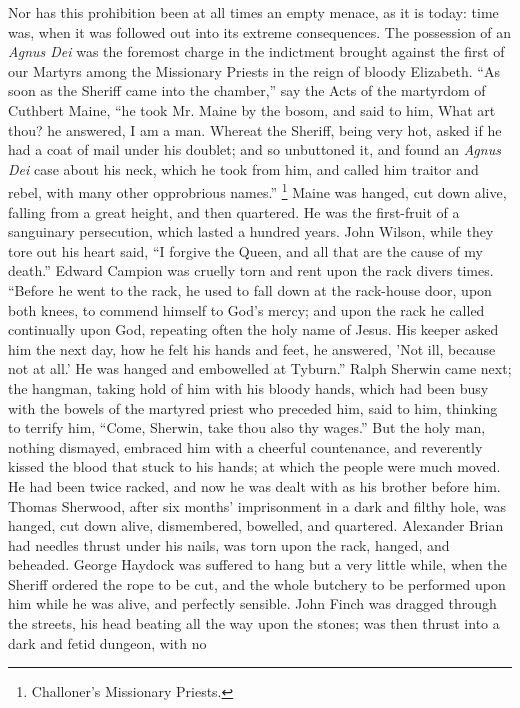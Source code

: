 Nor has this prohibition been at all times an empty
menace, as it is today: time was, when it was followed
out into its extreme consequences. The possession of an \emph{Agnus
Dei} was the foremost charge in the indictment
brought against the first of our Martyrs among the
Missionary Priests in the reign of bloody Elizabeth.
``As soon as the Sheriff came into the chamber,''
say the Acts of the martyrdom of Cuthbert Maine, ``he
took Mr. Maine by the bosom, and said to him, What art
thou? he answered, I am a man. Whereat the Sheriff, being
very hot, asked if he had a coat of mail under his
doublet; and so unbuttoned it, and found an \emph{Agnus Dei}
case about his neck, which he took from him, and called
him traitor and rebel, with many other opprobrious
names.'' \footnote{Challoner's Missionary
Priests.} Maine was hanged, cut down alive, falling from a
great height, and then quartered. He was the first-fruit
of a sanguinary persecution, which lasted a hundred
years. John Wilson, while they tore out his heart said,
``I forgive the Queen, and all that are the cause of
my death.'' Edward Campion was cruelly torn and rent
upon the rack divers times. ``Before he went to the
rack, he used to fall down at the rack-house door, upon
both knees, to commend himself to God's mercy; and upon
the rack he called continually upon God, repeating often
the holy name of Jesus. His keeper asked him the next
day, how he felt his hands and feet, he answered, 'Not
ill, because not at all.' He was hanged and embowelled at
Tyburn.'' Ralph Sherwin came next; the hangman,
taking hold of him with his bloody hands, which had been
busy with the bowels of the martyred priest who preceded
him, said to him, thinking to terrify him, ``Come,
Sherwin, take thou also thy wages.'' But the holy
man, nothing dismayed, embraced him with a cheerful
countenance, and reverently kissed the blood that stuck
to his hands; at which the people were much moved. He had
been twice racked, and now he was dealt with as his
brother before him. Thomas Sherwood, after six months'
imprisonment in a dark and filthy hole, was hanged, cut
down alive, dismembered, bowelled, and quartered.
Alexander Brian had needles thrust under his nails, was
torn upon the rack, hanged, and beheaded. George Haydock
was suffered to hang but a very little while, when the
Sheriff ordered the rope to be cut, and the whole
butchery to be performed upon him while he was alive, and
perfectly sensible. John Finch was dragged through the
streets, his head beating all the way upon the stones;
was then thrust into a dark and fetid dungeon, with no

